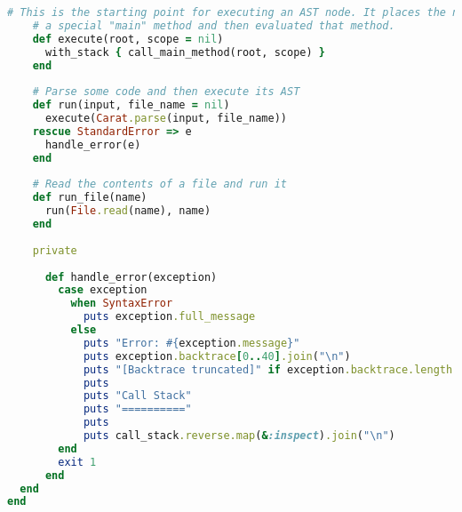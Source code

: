 \begin{lstlisting}[title={\small\Helvetica runtime/runtime.rb},language=Ruby]
    # This is the starting point for executing an AST node. It places the node as the contents of
    # a special "main" method and then evaluated that method.
    def execute(root, scope = nil)
      with_stack { call_main_method(root, scope) }
    end
    
    # Parse some code and then execute its AST
    def run(input, file_name = nil)
      execute(Carat.parse(input, file_name))
    rescue StandardError => e
      handle_error(e)
    end
    
    # Read the contents of a file and run it
    def run_file(name)
      run(File.read(name), name)
    end
    
    private
      
      def handle_error(exception)
        case exception
          when SyntaxError
            puts exception.full_message
          else
            puts "Error: #{exception.message}"
            puts exception.backtrace[0..40].join("\n")
            puts "[Backtrace truncated]" if exception.backtrace.length > 40
            puts
            puts "Call Stack"
            puts "=========="
            puts
            puts call_stack.reverse.map(&:inspect).join("\n")
        end
        exit 1
      end
  end
end

\end{lstlisting}
